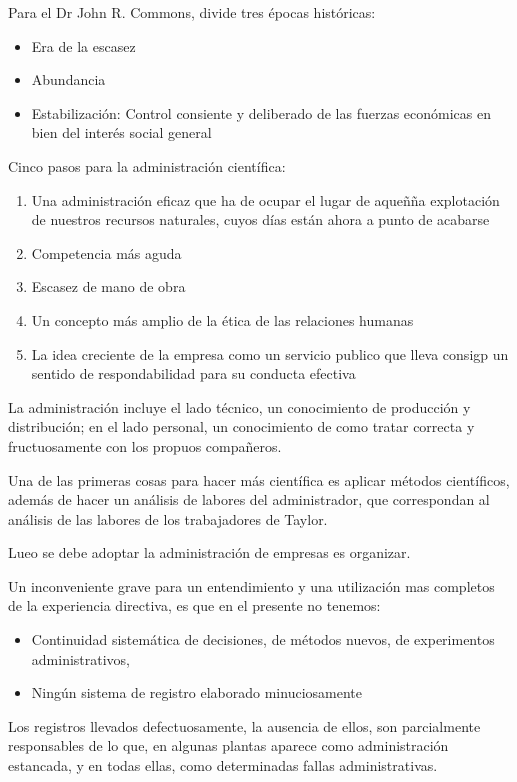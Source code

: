 Para el Dr John R. Commons, divide tres épocas históricas:
\begin{itemize}
    \item Era de la escasez
    \item Abundancia
    \item Estabilización: Control consiente y deliberado de las fuerzas económicas en bien del interés social general
\end{itemize}
Cinco pasos para la administración científica:
\begin{enumerate}
    \item Una administración eficaz que ha de ocupar el lugar de aqueñña explotación de nuestros recursos naturales, cuyos días están ahora a punto de acabarse
    \item Competencia más aguda
    \item Escasez de mano de obra
    \item Un concepto más amplio de la ética de las relaciones humanas
    \item La idea creciente de la empresa como un servicio publico que lleva consigp un sentido de respondabilidad para su conducta efectiva
\end{enumerate}
La administración incluye el lado técnico, un conocimiento de producción y distribución; en el lado personal, un conocimiento de como tratar correcta y fructuosamente con los propuos compañeros.

Una de las primeras cosas para hacer más científica es aplicar métodos científicos, además de hacer un análisis de labores del administrador, que correspondan al análisis de las labores de los trabajadores de Taylor.

Lueo se debe adoptar la administración de empresas es organizar.

Un inconveniente grave para un entendimiento y una utilización mas completos de la experiencia directiva, es que en el presente no tenemos:
\begin{itemize}
    \item Continuidad sistemática de decisiones, de métodos nuevos, de experimentos administrativos,
    \item Ningún sistema de registro elaborado minuciosamente
\end{itemize}
Los registros llevados defectuosamente, la ausencia de ellos, son parcialmente responsables de lo que, en algunas plantas aparece como administración estancada, y en todas ellas, como determinadas fallas administrativas.

